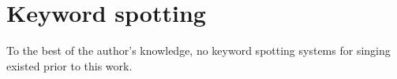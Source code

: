 \section{Keyword spotting}
To the best of the author's knowledge, no keyword spotting systems for singing existed prior to this work.


